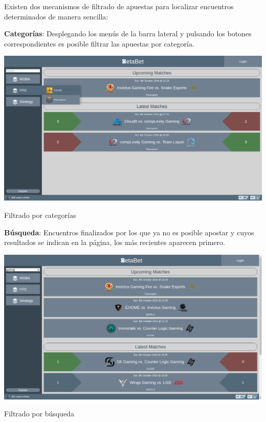 \documentclass{article}
\begin{document}
Existen dos mecanismos de filtrado de apuestas para localizar encuentros determinados de manera sencilla:
\begin{multicols}{2}
    \textbf{Categorías}: Desplegando los menús de la barra lateral y pulsando los botones correspondientes es posible filtrar las apuestas por categoría.
    \begin{minipage}{\linewidth}
        \centering
        \captionsetup{type=figure}
        \includegraphics[width=\linewidth]{fig3}
        \caption{Filtrado por categorías}
        \label{fig:fig3}
    \end{minipage}
    \columnbreak\newline
    \textbf{Búsqueda}: Encuentros finalizados por los que ya no es posible apostar y cuyos resultados se indican en la página, los más recientes aparecen primero.
    \begin{minipage}{\linewidth}
        \centering
        \captionsetup{type=figure}
        \includegraphics[width=\linewidth]{fig4}
        \caption{Filtrado por búsqueda}
        \label{fig:fig4}
    \end{minipage}
\end{multicols}
\newpage
\end{document}
